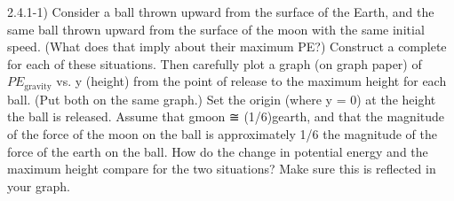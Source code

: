 
  
2.4.1-1) Consider a ball thrown upward from the surface of the Earth, and the same ball thrown upward from the surface of the moon with the same initial speed. (What does that imply about their maximum PE?) Construct a complete \EnergyDiagram{} for each of these situations. Then carefully plot a graph (on graph paper) of $PE_\text{gravity}$ vs. y (height) from the point of release to the maximum height for each ball. (Put both on the same graph.) Set the origin (where y = 0) at the height the ball is released. Assume that gmoon ≅ (1/6)gearth,  and that the magnitude of the force of the moon on the ball is approximately 1/6 the magnitude of the force of the earth on the ball. 
How do the change in potential energy and the maximum height compare for the two situations? Make sure this is reflected in your graph. 
